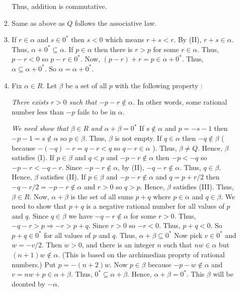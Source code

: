 \begin{enumerate}[{\bf Step 1.}]
\begin{enumerate}[(\text{A}1)]
    Thus, addition is commutative.

    \item Same as above as $Q$ follows the associative law.
    
    \item If $r \in \alpha$ and $s \in 0^*$ then $s < 0$ which means $r + s < r$.
    By (II), $r + s \in \alpha$. Thus, $\alpha + 0^* \subseteq \alpha$.
    \bigbreak 
    If $p \in \alpha$ then there is $r > p$ for some $r \in \alpha$.
    Thus, $p - r < 0$ so $p - r \in 0^*$. Now, $(p - r) + r = p \in \alpha + 0^*$.
    Thus, $\alpha \subseteq \alpha + 0^*$. 
    \bigbreak 
    So $\alpha = \alpha + 0^*$.

    \item Fix $\alpha \in R$. Let $\beta$ be a set of all $p$ with the following property : 
    
    {\it There exists $r > 0$ such that $- p - r \notin \alpha$.}
    \bigbreak
    In other words, some rational number less than $- p$ fails to be in $\alpha$.
    
    {\it We need show that $\beta \in R$ and $\alpha + \beta = 0^*$ }
    \bigbreak \quad
    If $s \notin \alpha$ and $p = - s - 1$ then $- p - 1 = s \notin \alpha$ so $p \in \beta$. Thus, $\beta$ is not empty.
    If $q \in \alpha$ then $-q \notin \beta$ ( because $-(-q) - r = q - r < q$ so $q-r \in \alpha$ ). Thus, $\beta \neq Q$. 
    Hence, $\beta$ satisfies (I).
    \bigbreak \quad
    If $p \in \beta$ and $q < p$ and $ - p - r \notin \alpha$ then $ -p < -q $ so $ - p - r < - q - r $. 
    Since $ - p - r \notin \alpha$, by (II), $ - q - r \notin \alpha $. Thus, $q \in\beta$. Hence, $\beta$ satisfies (II).
    \bigbreak \quad
    If $p \in \beta$ and $ - p - r \notin \alpha$ and $q = p + r/2$ then $ - q - r/2 = - p - r \notin \alpha$ and $r > 0$ so $q > p$.
    Hence, $\beta$ satisfies (III).
    \bigbreak 
    Thus, $\beta \in R$.
    \bigbreak \quad
    Now, $\alpha + \beta$ is the set of all sums $p + q$ where $p \in \alpha$ and $q \in \beta$. 
    We need to show that $p + q$ is a negative rational number for all values of $p$ and $q$.
    Since $q \in \beta$ we have $ - q - r \notin \alpha$ for some $r > 0$. 
    \bigbreak \quad
    Thus, $ - q - r > p  \Rightarrow - r > p + q $.
    Since $r > 0$ so $- r < 0$. Thus, $p + q < 0$. So $p + q \in 0^*$ for all values of $p$ and $q$.
    Thus, $\alpha + \beta \subseteq 0^*$
    \bigbreak \quad
    Now pick $v \in 0^*$ and $w = -v/2$. Then $w > 0$, and there is an integer $n$ such that $nw \in \alpha$
    but $(n+1)w \notin \alpha$. (This is based on the archimedian proprty of rational numbers.)
    Put $p = -(n+2)w$. Now $p \in \beta$ because $- p - w \notin \alpha$ and $v = nw + p \in \alpha + \beta$.
    Thus, $0^* \subseteq \alpha + \beta$. 
    \bigbreak \quad
    Hence, $\alpha + \beta = 0^*$. This $\beta$ will be deonted by $-\alpha$.


\end{enumerate}
\end{enumerate}
